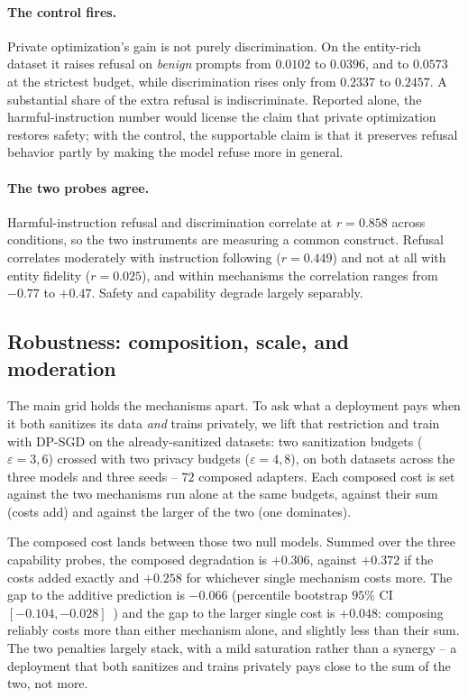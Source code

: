 \paragraph{The control fires.}
Private optimization's gain is not purely discrimination.
On the entity-rich dataset it raises refusal on \textit{benign} prompts from $0.0102$ to $0.0396$,
and to $0.0573$ at the strictest budget,
while discrimination rises only from $0.2337$ to $0.2457$.
A substantial share of the extra refusal is indiscriminate.
Reported alone,
the harmful-instruction number would license the claim that private optimization restores safety;
with the control,
the supportable claim is that it preserves refusal behavior partly by making the model refuse more in general.

\paragraph{The two probes agree.}
Harmful-instruction refusal and discrimination correlate at $r = 0.858$ across conditions,
so the two instruments are measuring a common construct.
Refusal correlates moderately with instruction following ($r = 0.449$) and not at all with entity fidelity ($r = 0.025$),
and within mechanisms the correlation ranges from $-0.77$ to $+0.47$.
Safety and capability degrade largely separably.

\subsection{\label{apx:composition}Robustness: composition, scale, and moderation}
The main grid holds the mechanisms apart.
To ask what a deployment pays when it both sanitizes its data \textit{and} trains privately,
we lift that restriction and train with DP-SGD on the already-sanitized datasets:
two sanitization budgets ($\varepsilon = 3, 6$) crossed with two privacy budgets ($\varepsilon = 4, 8$),
on both datasets across the three models and three seeds -- $72$ composed adapters.
Each composed cost is set against the two mechanisms run alone at the same budgets,
against their sum (costs add) and against the larger of the two (one dominates).

The composed cost lands between those two null models.
Summed over the three capability probes,
the composed degradation is $+0.306$,
against $+0.372$ if the costs added exactly and $+0.258$ for whichever single mechanism costs more.
The gap to the additive prediction is $-0.066$ (percentile bootstrap $95\%$ CI $[-0.104, -0.028]$~\citep{efron1994introduction}) and the gap to the larger single cost is $+0.048$:
composing reliably costs more than either mechanism alone,
and slightly less than their sum.
The two penalties largely stack,
with a mild saturation rather than a synergy -- a deployment that both sanitizes and trains privately pays close to the sum of the two,
not more.

